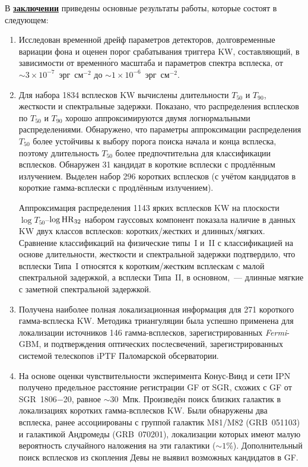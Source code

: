 \FloatBarrier
В \underline{\textbf{заключении}} приведены основные результаты работы, 
которые состоят в следующем:
\begin{enumerate}
 
\item Исследован временной дрейф параметров детекторов, долговременные вариации фона и оценен порог 
    срабатывания триггера KW, составляющий, в зависимости от временн\'{о}го масштаба 
    и параметров спектра всплеска, от $\sim 3\times 10^{-7}$~эрг~см$^{-2}$ до
    $\sim 1\times 10^{-6}$~эрг~см$^{-2}$. 
    
\item Для набора 1834 всплесков KW вычислены длительности $T_{50}$ и $T_{90}$, жесткости 
    и спектральные задержки. Показано, что распределения 
    всплесков по $T_{50}$ и $T_{90}$ хорошо аппроксимируются двумя логнормальными 
    распределениями. Обнаружено, что параметры аппроксимации распределения $T_{50}$ 
    более устойчивы к выбору порога поиска начала и конца всплеска, поэтому длительность 
    $T_{50}$ более предпочтительна для классификации всплесков. 
    Обнаружен 31 кандидат в короткие всплески с продлённым излучением.
    Выделен набор 296 коротких всплесков (с учётом кандидатов 
    в короткие гамма-всплески с продлённым излучением). 
      
    Аппроксимация распределения 1143 ярких всплесков KW на плоскости $\log T_{50}$--$\log {\mathrm{HR}}_{32}$ 
    набором гауссовых компонент показала наличие 
    в данных KW двух классов всплесков: коротких/жестких и длинных/мягких. 
    Сравнение классификаций на физические типы~I и~II с классификацией на основе 
    длительности, жесткости и спектральной задержки подтвердило, что всплески Типа~I 
    относятся к коротким/жестким всплескам с малой спектральной задержкой, а всплески 
    Типа~II, в основном,~--- длинные мягкие с заметной спектральной задержкой. 
    
\item Получена наиболее полная локализационная информация для 271 короткого 
    гамма-всплеска KW. 
    Методика триангуляции была успешно применена для 
    локализации источников 146 гамма-всплесков, зарегистрированных \textit{Fermi}-GBM, и
    подтверждения оптических послесвечений, зарегистрированных системой телескопов 
    iPTF Паломарской обсерватории.
    
\item На основе оценки чувствительности эксперимента Конус-Винд и сети IPN получено 
    предельное расстояние регистрации GF от SGR, схожих с GF от SGR~1806$-$20, 
    равное $\sim 30$~Мпк. 
    Произведён поиск близких галактик в локализациях коротких гамма-всплесков KW. 
    Были обнаружены два всплеска, ранее 
    ассоциированы с группой галактик M81/M82 (GRB~051103) и галактикой Андромеды (GRB~070201),
    локализации которых имеют малую вероятность случайного наложения на эти галактики ($\sim 1$\%).
    Дополнительный поиск всплесков из скопления Девы не выявил возможных кандидатов в GF.
    

\end{enumerate}
